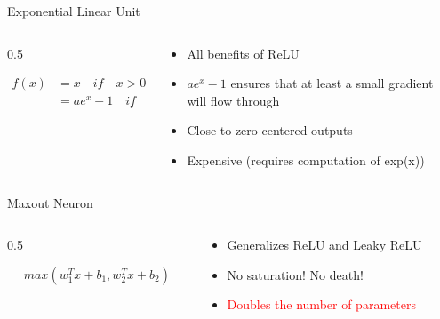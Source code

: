 \begin{frame}
\begin{flushleft}
Exponential Linear Unit
\end{flushleft}
	
	\begin{columns}
		\begin{column} {0.5\textwidth}
			\begin{center}
				
			\end{center}
			
			\begin{align*}
				f(x) & = x \quad {if \quad x > 0}           \\
				     & = a e^{x} - 1 \quad {if \quad x \leq 0} 
			\end{align*}
			
		\end{column}
		\begin{column}{0.5\textwidth}
			\begin{itemize}
				\justifying
				\item<1-> All benefits of ReLU
				\item<2-> $a e^{x} - 1$ ensures that at least a small gradient will flow through 
				\item<3-> Close to zero centered outputs
				\item<4-> Expensive (requires computation of exp(x))
			\end{itemize}
			
		\end{column}
		
	\end{columns}    
\end{frame}


\begin{frame}
\begin{flushleft}
Maxout Neuron
\end{flushleft}
	
	\begin{columns}
		\begin{column} {0.5\textwidth}
			
			
			\begin{equation*}
				max (w_1^T x + b_1, w_2^T x+b_2)
			\end{equation*}
			
			
		\end{column}
		\begin{column}{0.5\textwidth}
			\begin{itemize}
				\justifying
				\item<1-> Generalizes ReLU and Leaky ReLU
				\item<2-> No saturation! No death!
				\item<3-> \textcolor{red}{Doubles the number of parameters}
			\end{itemize}
			
		\end{column}
		
	\end{columns}    
\end{frame}


